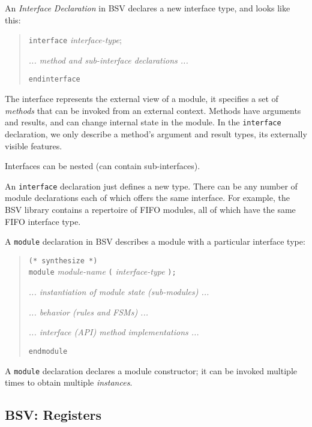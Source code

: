 An \emph{Interface Declaration} in BSV declares a new interface type,
and looks like this:

\begin{quote}
{\tt interface} \emph{interface-type};

\hmm \emph{... method and sub-interface declarations ...}

{\tt endinterface}
\end{quote}

The interface represents the external view of a module, {\ie} it
specifies a set of \emph{methods} that can be invoked from an external
context.  Methods have arguments and results, and can change internal
state in the module.  In the \verb|interface| declaration, we only
describe a method's argument and result types, {\ie} its externally
visible features.

Interfaces can be nested (can contain sub-interfaces).

An \verb|interface| declaration just defines a new type.  There can be
any number of module declarations each of which offers the same
interface.  For example, the BSV library contains a repertoire of FIFO
modules, all of which have the same FIFO interface type.

A \verb|module| declaration in BSV describes a module with a
particular interface type:

\begin{quote}
{\tt (* synthesize *)} \\
{\tt module} \emph{module-name} {\tt (} \emph{interface-type} {\tt );}

\hmm \emph{... instantiation of module state (sub-modules) ...}

\hmm \emph{... behavior (rules and FSMs) ...}

\hmm \emph{... interface (API) method implementations ...}

{\tt endmodule}
\end{quote}


A \verb|module| declaration declares a module constructor; it can be
invoked multiple times to obtain multiple \emph{instances}.


\subsection{BSV: Registers}

